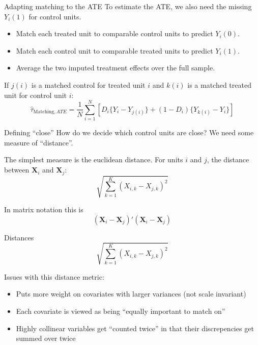 \documentclass[aspectratio=169,t,11pt,table]{beamer}
\begin{document}
\begin{frame}{Adapting matching to the ATE}
  To estimate the ATE, we also need the missing $Y_i(1)$ for control units.
  \begin{itemize}
    \item Match each treated unit to comparable control units to predict $Y_i(0)$.
    \item Match each control unit to comparable treated units to predict $Y_i(1)$.
    \item Average the two imputed treatment effects over the full sample.
  \end{itemize}

  \bigskip
  If $j(i)$ is a matched control for treated unit $i$ and $k(i)$ is a matched treated unit for control unit $i$:
  $$
    \hat{\tau}_{\text{Matching}, ATE} =
    \frac{1}{N} \sum_{i=1}^N \left[D_i\{Y_i - Y_{j(i)}\} + (1-D_i)\{Y_{k(i)} - Y_i\}\right]
  $$
\end{frame}

\begin{frame}{Defining ``close''}
  How do we decide which control units are close? We need some measure of ``distance''. 

  \bigskip
  The simplest measure is the \alert{euclidean distance}. For units $i$ and $j$, the distance between $\bm{X}_i$ and $\bm{X}_j$:
  $$
    \sqrt{\sum_{k = 1}^K (X_{i,k} - X_{j, k})^2}
  $$

  \pause 
  \bigskip
  In matrix notation this is 
  $$
    (\bm{X}_i - \bm{X}_j)' (\bm{X}_i - \bm{X}_j)
  $$
\end{frame}

\begin{frame}{Distances}
  $$
    \sqrt{\sum_{k = 1}^K (X_{i,k} - X_{j, k})^2}
  $$

  \bigskip
  Issues with this distance metric:
  \begin{itemize}
    \item Puts more weight on covariates with larger variances (not scale invariant)
    
    \item Each covariate is viewed as being ``equally important to match on''
    
    \item Highly collinear variables get ``counted twice'' in that their discrepencies get summed over twice 
  \end{itemize}

\end{frame}
\end{document}
